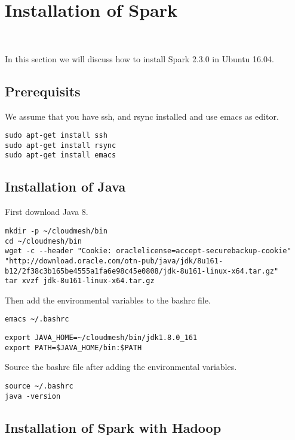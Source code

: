 \section{Installation of Spark}
\label{c:spark-local-installation}
\FILENAME\

In this section we will discuss how to install Spark 2.3.0 in Ubuntu 16.04.

\subsection{Prerequisits}

We assume that you have ssh, and rsync installed and
use emacs as editor. 

\begin{lstlisting}
sudo apt-get install ssh
sudo apt-get install rsync
sudo apt-get install emacs
\end{lstlisting}

\subsection{Installation of Java}

First download Java 8.

\begin{lstlisting}
mkdir -p ~/cloudmesh/bin
cd ~/cloudmesh/bin
wget -c --header "Cookie: oraclelicense=accept-securebackup-cookie" "http://download.oracle.com/otn-pub/java/jdk/8u161-b12/2f38c3b165be4555a1fa6e98c45e0808/jdk-8u161-linux-x64.tar.gz"
tar xvzf jdk-8u161-linux-x64.tar.gz
\end{lstlisting}

Then add the environmental variables to the bashrc file. 

\begin{lstlisting}
emacs ~/.bashrc
\end{lstlisting}

\begin{lstlisting}
export JAVA_HOME=~/cloudmesh/bin/jdk1.8.0_161
export PATH=$JAVA_HOME/bin:$PATH
\end{lstlisting}

Source the bashrc file after adding the environmental variables.

\begin{lstlisting}
source ~/.bashrc
java -version
\end{lstlisting}

\subsection{Installation of Spark with Hadoop}

